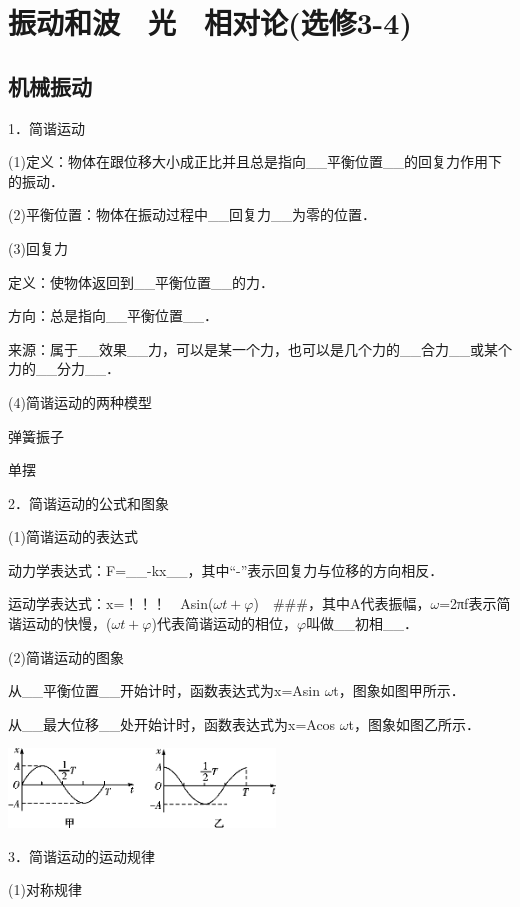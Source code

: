\chapter{振动和波　光　相对论(选修3-4)}

\section{机械振动}


1．简谐运动

(1)定义：物体在跟位移大小成正比并且总是指向\_\_平衡位置\_\_的回复力作用下的振动．

(2)平衡位置：物体在振动过程中\_\_回复力\_\_为零的位置．

(3)回复力

定义：使物体返回到\_\_平衡位置\_\_的力．

方向：总是指向\_\_平衡位置\_\_．

来源：属于\_\_效果\_\_力，可以是某一个力，也可以是几个力的\_\_合力\_\_或某个力的\_\_分力\_\_．

(4)简谐运动的两种模型

弹簧振子

单摆

2．简谐运动的公式和图象

(1)简谐运动的表达式

动力学表达式：F=\_\_-kx\_\_，其中``-''表示回复力与位移的方向相反．

运动学表达式：x=！！！　Asin($\omega t+\varphi$)　\#\#\#，其中A代表振幅，$\omega$=2πf表示简谐运动的快慢，($\omega t+\varphi$)代表简谐运动的相位，$\varphi$叫做\_\_初相\_\_．

(2)简谐运动的图象

从\_\_平衡位置\_\_开始计时，函数表达式为x=Asin $\omega$t，图象如图甲所示．

从\_\_最大位移\_\_处开始计时，函数表达式为x=Acos $\omega$t，图象如图乙所示．

\begin{center}\includegraphics[width=2.79236in,height=0.82986in]{media/image511.png}\end{center}
3．简谐运动的运动规律

(1)对称规律


